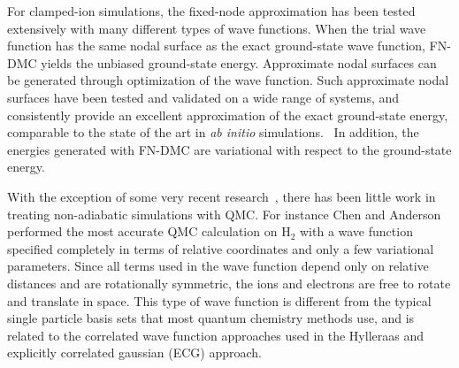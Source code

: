 \documentclass[aip,jcp,numerical,reprint]{revtex4-1}
\begin{document}
For clamped-ion simulations, the fixed-node approximation has been tested extensively with many different types of wave functions.  When the trial wave function has the same nodal surface as the exact ground-state wave function, FN-DMC yields the unbiased ground-state energy.  Approximate nodal surfaces can be generated through optimization of the wave function. Such approximate nodal surfaces have been tested and validated on a wide range of systems, and consistently provide an excellent approximation of the exact ground-state energy, comparable to the state of the art in \textit{ab initio} simulations.~\cite{Stuart_Review,rothstein1,grossman1,Yang2015,Tubman_Release} In addition, the energies generated with FN-DMC are variational with respect to the ground-state energy.


With the exception of some very recent research~\cite{Tubman_ECG,Yang2015}, there has been little work in treating non-adiabatic simulations with QMC.  For instance Chen and Anderson \cite{chen1995} performed the most accurate QMC calculation on  H$_{2}$ with a wave function specified completely in terms of relative coordinates and only a few variational parameters.  
Since all terms used in the wave function depend only on relative distances and are rotationally symmetric, the ions and electrons are free to rotate and translate in space.   This type of wave function is different from the typical single particle basis sets that most quantum chemistry methods use, and is related to the correlated wave function approaches used in the Hylleraas and explicitly correlated gaussian (ECG) approach.  
\end{document}
